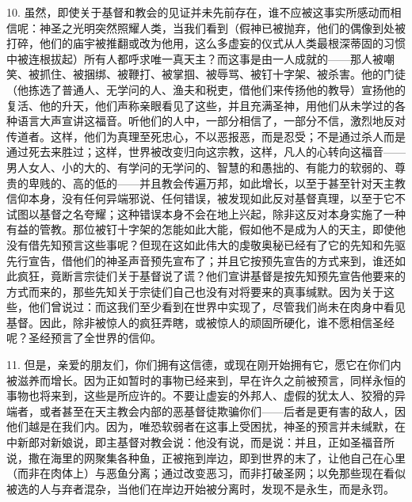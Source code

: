 10. 虽然，即使关于基督和教会的见证并未先前存在，谁不应被这事实所感动而相信呢：神圣之光明突然照耀人类，当我们看到（假神已被抛弃，他们的偶像到处被打碎，他们的庙宇被推翻或改为他用，这么多虚妄的仪式从人类最根深蒂固的习惯中被连根拔起）所有人都呼求唯一真天主？而这事是由一人成就的——那人被嘲笑、被抓住、被捆绑、被鞭打、被掌掴、被辱骂、被钉十字架、被杀害。他的门徒（他拣选了普通人、无学问的人、渔夫和税吏，借他们来传扬他的教导）宣扬他的复活、他的升天，他们声称亲眼看见了这些，并且充满圣神，用他们从未学过的各种语言大声宣讲这福音。听他们的人中，一部分相信了，一部分不信，激烈地反对传道者。这样，他们为真理至死忠心，不以恶报恶，而是忍受；不是通过杀人而是通过死去来胜过；这样，世界被改变归向这宗教，这样，凡人的心转向这福音——男人女人、小的大的、有学问的无学问的、智慧的和愚拙的、有能力的软弱的、尊贵的卑贱的、高的低的——并且教会传遍万邦，如此增长，以至于甚至针对天主教信仰本身，没有任何异端邪说、任何错误，被发现如此反对基督真理，以至于它不试图以基督之名夸耀；这种错误本身不会在地上兴起，除非这反对本身实施了一种有益的管教。那位被钉十字架的怎能如此大能，假如他不是成为人的天主，即使他没有借先知预言这些事呢？但现在这如此伟大的虔敬奥秘已经有了它的先知和先驱先行宣告，借他们的神圣声音预先宣布了；并且它按预先宣告的方式来到，谁还如此疯狂，竟断言宗徒们关于基督说了谎？他们宣讲基督是按先知预先宣告他要来的方式而来的，那些先知关于宗徒们自己也没有对将要来的真事缄默。因为关于这些，他们曾说过：而这我们至少看到在世界中实现了，尽管我们尚未在肉身中看见基督。因此，除非被惊人的疯狂弄瞎，或被惊人的顽固所硬化，谁不愿相信圣经呢？圣经预言了全世界的信仰。\par

11. 但是，亲爱的朋友们，你们拥有这信德，或现在刚开始拥有它，愿它在你们内被滋养而增长。因为正如暂时的事物已经来到，早在许久之前被预言，同样永恒的事物也将来到，这些是所应许的。不要让虚妄的外邦人、虚假的犹太人、狡猾的异端者，或者甚至在天主教会内部的恶基督徒欺骗你们——后者是更有害的敌人，因他们越是在我们内。因为，唯恐软弱者在这事上受困扰，神圣的预言并未缄默，在中新郎对新娘说，即主基督对教会说：他没有说，而是说：并且，正如圣福音所说，撒在海里的网聚集各种鱼，正被拖到岸边，即到世界的末了，让他自己在心里（而非在肉体上）与恶鱼分离；通过改变恶习，而非打破圣网；以免那些现在看似被选的人与弃者混杂，当他们在岸边开始被分离时，发现不是永生，而是永罚。\par

